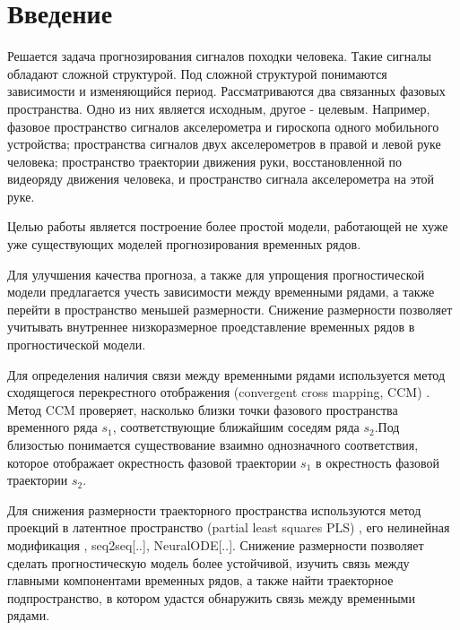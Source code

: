 \documentclass[12pt]{extarticle}
\begin{document}






\section{Введение}





Решается задача прогнозирования сигналов походки человека. Такие сигналы обладают сложной структурой. Под сложной структурой понимаются зависимости и изменяющийся период. Рассматриваются два связанных фазовых пространства. Одно из них является исходным, другое - целевым. Например, фазовое пространство сигналов акселерометра и гироскопа одного мобильного устройства; пространства сигналов двух акселерометров в правой и левой руке человека; пространство траектории движения руки, восстановленной по видеоряду движения человека, и пространство сигнала акселерометра на этой руке.

 Целью работы является построение более простой модели, работающей не хуже уже существующих моделей прогнозирования временных рядов.

Для улучшения качества прогноза, а также для упрощения прогностической модели предлагается учесть зависимости между временными рядами, а также перейти в пространство меньшей размерности. Снижение размерности позволяет учитывать внутреннее низкоразмерное проедставление временных рядов в прогностической модели. 

Для определения наличия связи между временными рядами используется метод сходящегося перекрестного отображения (convergent cross mapping, CCM) \cite{sugihara1990nonlinear, sugihara2012detecting}. Метод CCM проверяет, насколько близки точки фазового пространства временного ряда $s_1$, соответствующие ближайшим соседям ряда $s_2$.Под близостью понимается существование взаимно однозначного соответствия, которое отображает окрестность фазовой траектории $s_1$ в окрестность фазовой траектории $s_2$.

Для снижения размерности траекторного пространства используются метод проекций в латентное пространство (partial least squares PLS) \cite{geladi1988notes, hoskuldsson1988pls}, его нелинейная модификация \cite{yaushev}, seq2seq[..], NeuralODE[..]. Снижение размерности позволяет сделать прогностическую модель более устойчивой, изучить связь между главными компонентами временных рядов, а также найти траекторное подпространство, в котором удастся обнаружить связь между временными рядами.
\end{document}
